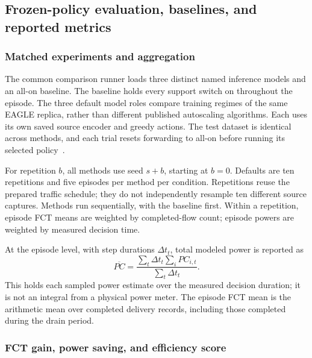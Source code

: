 \documentclass[11pt,a4paper]{article}
\begin{document}
\subsection{Frozen-policy evaluation, baselines, and reported metrics}
\label{sec:evaluation}

\subsubsection{Matched experiments and aggregation}

The common comparison runner loads three distinct named inference models and
an all-on baseline. The baseline holds every support switch on throughout
the episode. The three default model roles compare training regimes of the
same EAGLE replica, rather than different published autoscaling algorithms.
Each uses its own saved source encoder and greedy actions. The test dataset is
identical across methods, and each trial resets forwarding to all-on before
running its selected policy~\cite{code-evaluation}.

For repetition $b$, all methods use seed $s+b$, starting at $b=0$. Defaults
are ten repetitions and five episodes per method per condition. Repetitions
reuse the prepared traffic schedule; they do not independently resample ten
different source captures. Methods run sequentially, with the baseline first.
Within a repetition, episode FCT means are weighted by completed-flow count;
episode powers are weighted by measured decision time.

At the episode level, with step durations $\Delta t_t$, total modeled power is
reported as
\begin{equation}
 \overline{PC}=
 \frac{\sum_t\Delta t_t\sum_i PC_{i,t}}{\sum_t\Delta t_t}.
 \label{eq:mean-power}
\end{equation}
This holds each sampled power estimate over the measured decision duration;
it is not an integral from a physical power meter. The episode FCT mean is
the arithmetic mean over completed delivery records, including those completed
during the drain period.

\subsubsection{FCT gain, power saving, and efficiency score}
\end{document}
